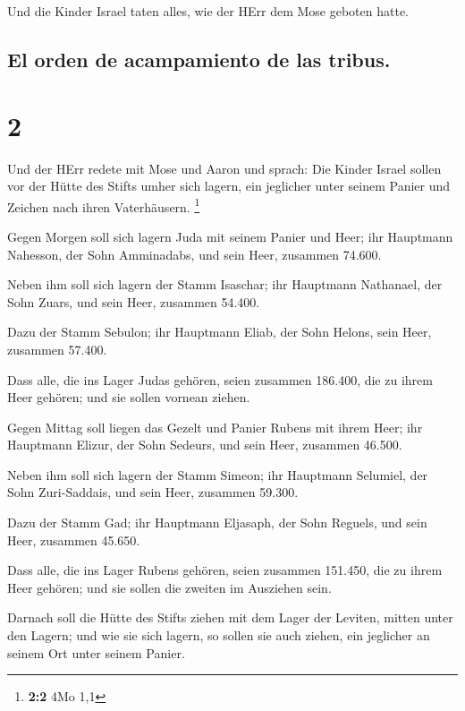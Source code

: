  Und die Kinder Israel taten alles, wie der HErr dem Mose
geboten hatte.

\hypertarget{el-orden-de-acampamiento-de-las-tribus.}{%
\subsection{El orden de acampamiento de las
tribus.}\label{el-orden-de-acampamiento-de-las-tribus.}}

\hypertarget{section-1}{%
\section{2}\label{section-1}}

 Und der HErr redete mit Mose und Aaron und sprach:
 Die Kinder Israel sollen vor der Hütte des Stifts umher
sich lagern, ein jeglicher unter seinem Panier und Zeichen nach ihren
Vaterhäusern. \footnote{\textbf{2:2} 4Mo 1,1}

 Gegen Morgen soll sich lagern Juda mit seinem Panier und
Heer; ihr Hauptmann Nahesson, der Sohn Amminadabs,  und
sein Heer, zusammen 74.600.

 Neben ihm soll sich lagern der Stamm Isaschar; ihr
Hauptmann Nathanael, der Sohn Zuars,  und sein Heer,
zusammen 54.400.

 Dazu der Stamm Sebulon; ihr Hauptmann Eliab, der Sohn
Helons,  sein Heer, zusammen 57.400.

 Dass alle, die ins Lager Judas gehören, seien zusammen
186.400, die zu ihrem Heer gehören; und sie sollen vornean ziehen.

 Gegen Mittag soll liegen das Gezelt und Panier Rubens
mit ihrem Heer; ihr Hauptmann Elizur, der Sohn Sedeurs, 
und sein Heer, zusammen 46.500.

 Neben ihm soll sich lagern der Stamm Simeon; ihr
Hauptmann Selumiel, der Sohn Zuri-Saddais,  und sein
Heer, zusammen 59.300.

 Dazu der Stamm Gad; ihr Hauptmann Eljasaph, der Sohn
Reguels,  und sein Heer, zusammen 45.650.

 Dass alle, die ins Lager Rubens gehören, seien zusammen
151.450, die zu ihrem Heer gehören; und sie sollen die zweiten im
Ausziehen sein.

 Darnach soll die Hütte des Stifts ziehen mit dem Lager
der Leviten, mitten unter den Lagern; und wie sie sich lagern, so sollen
sie auch ziehen, ein jeglicher an seinem Ort unter seinem Panier.

